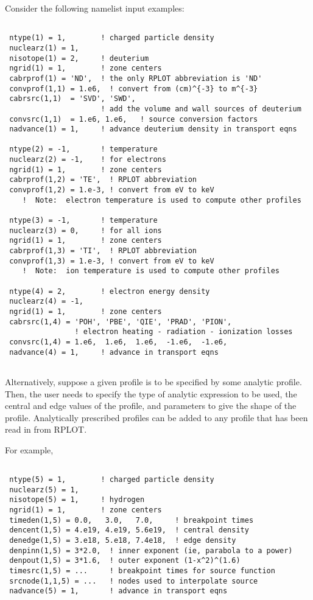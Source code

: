 Consider the following namelist input examples:
\begin{verbatim}

 ntype(1) = 1,        ! charged particle density
 nuclearz(1) = 1,
 nisotope(1) = 2,     ! deuterium
 ngrid(1) = 1,        ! zone centers
 cabrprof(1) = 'ND',  ! the only RPLOT abbreviation is 'ND'
 convprof(1,1) = 1.e6,  ! convert from (cm)^{-3} to m^{-3}
 cabrsrc(1,1)  = 'SVD', 'SWD',
                      ! add the volume and wall sources of deuterium
 convsrc(1,1)  = 1.e6, 1.e6,   ! source conversion factors
 nadvance(1) = 1,     ! advance deuterium density in transport eqns

 ntype(2) = -1,       ! temperature
 nuclearz(2) = -1,    ! for electrons
 ngrid(1) = 1,        ! zone centers
 cabrprof(1,2) = 'TE',  ! RPLOT abbreviation
 convprof(1,2) = 1.e-3, ! convert from eV to keV
    !  Note:  electron temperature is used to compute other profiles 

 ntype(3) = -1,       ! temperature
 nuclearz(3) = 0,     ! for all ions
 ngrid(1) = 1,        ! zone centers
 cabrprof(1,3) = 'TI',  ! RPLOT abbreviation
 convprof(1,3) = 1.e-3, ! convert from eV to keV
    !  Note:  ion temperature is used to compute other profiles 

 ntype(4) = 2,        ! electron energy density
 nuclearz(4) = -1,
 ngrid(1) = 1,        ! zone centers
 cabrsrc(1,4) = 'POH', 'PBE', 'QIE', 'PRAD', 'PION',
                ! electron heating - radiation - ionization losses
 convsrc(1,4) = 1.e6,  1.e6,  1.e6,  -1.e6,  -1.e6,
 nadvance(4) = 1,     ! advance in transport eqns
 
\end{verbatim}

Alternatively, suppose a given profile is to be specified by some
analytic profile.  Then, the user needs to specify the type of analytic
expression to be used, the central and edge values of the profile, and
parameters to give the shape of the profile.
Analytically prescribed profiles can be added to any profile that has
been read in from RPLOT.

For example,
\begin{verbatim}

 ntype(5) = 1,        ! charged particle density
 nuclearz(5) = 1,
 nisotope(5) = 1,     ! hydrogen
 ngrid(1) = 1,        ! zone centers
 timeden(1,5) = 0.0,   3.0,   7.0,     ! breakpoint times
 dencent(1,5) = 4.e19, 4.e19, 5.6e19,  ! central density
 denedge(1,5) = 3.e18, 5.e18, 7.4e18,  ! edge density
 denpinn(1,5) = 3*2.0,  ! inner exponent (ie, parabola to a power)
 denpout(1,5) = 3*1.6,  ! outer exponent (1-x^2)^(1.6)
 timesrc(1,5) = ...     ! breakpoint times for source function
 srcnode(1,1,5) = ...   ! nodes used to interpolate source
 nadvance(5) = 1,       ! advance in transport eqns
 
\end{verbatim}

